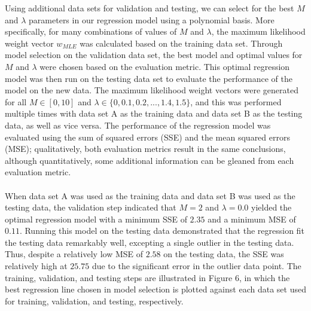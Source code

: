 \documentclass{article}
\begin{document}
Using additional data sets for validation and testing, we can select for the best $M$ and $\lambda$ parameters in our regression model using a polynomial basis. More specifically, for many combinations of values of $M$ and $\lambda$, the maximum likelihood weight vector $w_{MLE}$ was calculated based on the training data set. Through model selection on the validation data set, the best model and optimal values for $M$ and $\lambda$ were chosen based on the evaluation metric. This optimal regression model was then run on the testing data set to evaluate the performance of the model on the new data. The maximum likelihood weight vectors were generated for all $M \in [0, 10]$ and $\lambda \in \{0, 0.1, 0.2, ..., 1.4, 1.5\}$, and this was performed multiple times with data set A as the training data and data set B as the testing data, as well as vice versa. The performance of the regression model was evaluated using the sum of squared errors (SSE) and the mean squared errors (MSE); qualitatively, both evaluation metrics result in the same conclusions, although quantitatively, some additional information can be gleaned from each evaluation metric. \\ \\
When data set A was used as the training data and data set B was used as the testing data, the validation step indicated that $M = 2$ and $\lambda=0.0$ yielded the optimal regression model with a minimum SSE of $2.35$ and a minimum MSE of $0.11$. Running this model on the testing data demonstrated that the regression fit the testing data remarkably well, excepting a single outlier in the testing data. Thus, despite a relatively low MSE of $2.58$ on the testing data, the SSE was relatively high at $25.75$ due to the significant error in the outlier data point. The training, validation, and testing steps are illustrated in Figure 6, in which the best regression line chosen in model selection is plotted against each data set used for training, validation, and testing, respectively. \\ \\
\end{document}

